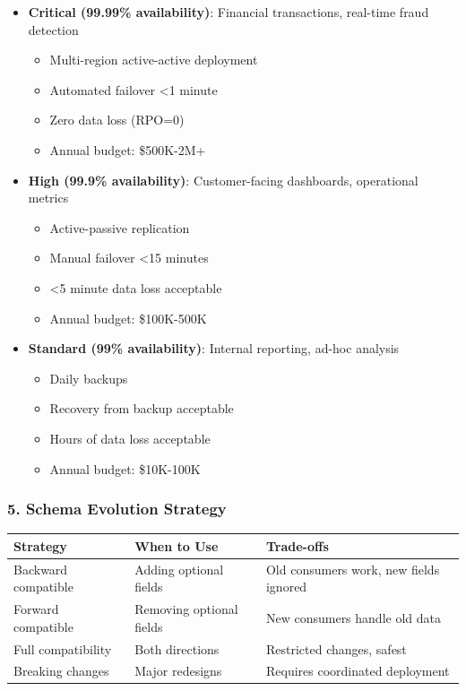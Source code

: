 \begin{itemize}
    \item \textbf{Critical (99.99\% availability)}: Financial transactions, real-time fraud detection
        \begin{itemize}
            \item Multi-region active-active deployment
            \item Automated failover <1 minute
            \item Zero data loss (RPO=0)
            \item Annual budget: \$500K-2M+
        \end{itemize}

    \item \textbf{High (99.9\% availability)}: Customer-facing dashboards, operational metrics
        \begin{itemize}
            \item Active-passive replication
            \item Manual failover <15 minutes
            \item <5 minute data loss acceptable
            \item Annual budget: \$100K-500K
        \end{itemize}

    \item \textbf{Standard (99\% availability)}: Internal reporting, ad-hoc analysis
        \begin{itemize}
            \item Daily backups
            \item Recovery from backup acceptable
            \item Hours of data loss acceptable
            \item Annual budget: \$10K-100K
        \end{itemize}
\end{itemize}

\subsubsection{5. Schema Evolution Strategy}

\begin{tabular}{|p{3.5cm}|p{5cm}|p{5cm}|}
\hline
\textbf{Strategy} & \textbf{When to Use} & \textbf{Trade-offs} \\
\hline
Backward compatible & Adding optional fields & Old consumers work, new fields ignored \\
\hline
Forward compatible & Removing optional fields & New consumers handle old data \\
\hline
Full compatibility & Both directions & Restricted changes, safest \\
\hline
Breaking changes & Major redesigns & Requires coordinated deployment \\
\hline
\end{tabular}

